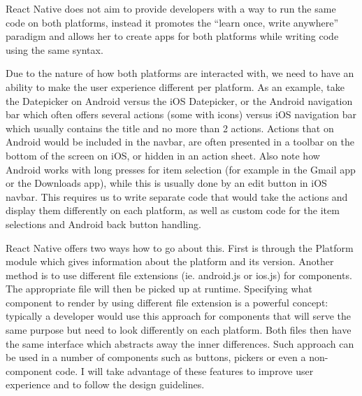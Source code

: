 React Native does not aim to provide developers with a way to run the same code on both platforms, instead it promotes the “learn once, write anywhere” paradigm and allows her to create apps for both platforms while writing code using the same syntax.


Due to the nature of how both platforms are interacted with, we need to have an ability to make the user experience different per platform. As an example, take the Datepicker on Android versus the iOS Datepicker, or the Android navigation bar which often offers several actions (some with icons) versus iOS navigation bar which usually contains the title and no more than 2 actions. 
Actions that on Android would be included in the navbar, are often presented in a toolbar on the bottom of the screen on iOS, or hidden in an action sheet. Also note how Android works with long presses for item selection (for example in the Gmail app or the Downloads app), while this is usually done by an edit button in iOS navbar. This requires us to write separate code that would take the actions and display them differently on each platform, as well as custom code for the item selections and Android back button handling.


React Native offers two ways how to go about this. First is through the Platform module which gives information about the platform and its version. Another method is to use different file extensions (ie. android.js or ios.js) for components. The appropriate file will then be picked up at runtime. Specifying what component to render by using different file extension is a powerful concept: typically a developer would use this approach for components that will serve the same purpose but need to look differently on each platform. Both files then have the same interface which abstracts away the inner differences. Such approach can be used in a number of components such as buttons, pickers or even a non-component code. I will take advantage of these features to improve user experience and to follow the design guidelines.


